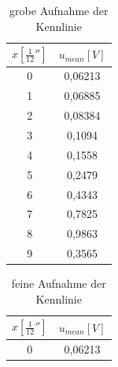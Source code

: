 \documentclass[a4paper]{article}
\begin{document}
\begin{table}[h]
    \centering
    \caption{grobe Aufnahme der Kennlinie}
    \label{6-3-2-grobeMessung}
    \begin{tabular}{|c|c|}
        \hline
        $x \unit{[\frac{1}{12}'']}$&  $u_{mean}\unit{[V]}$ \\
        \hline
        0 & 0,06213\\
        1 & 0,06885\\
        2 & 0,08384\\
        3 & 0,1094\\
        4 & 0,1558\\
        5 & 0,2479\\
        6 & 0,4343\\
        7 & 0,7825\\
        8 & 0,9863\\
        9 & 0,3565\\
        \hline
    \end{tabular}
\end{table}

\begin{table}[h]
    \centering
    \caption{feine Aufnahme der Kennlinie}
    \label{6-3-2-feineMessung}
    \begin{tabular}{|c|c|}
        \hline
        $x \unit{[\frac{1}{12}'']}$&  $u_{mean}\unit{[V]}$ \\
        \hline
        0 & 0,06213\\
        \hline
    \end{tabular}
\end{table}
\end{document}
